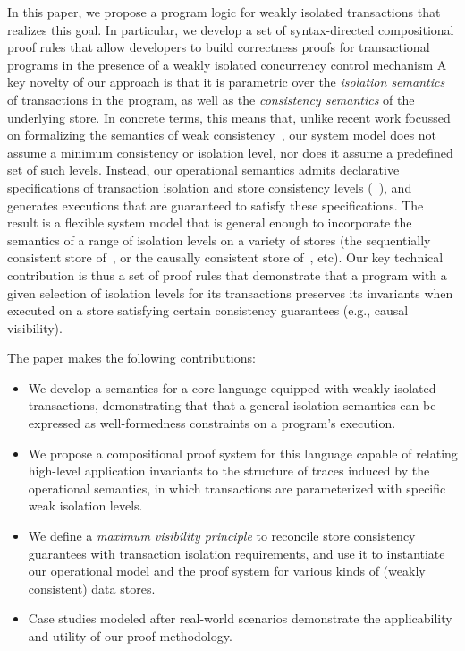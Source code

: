 
In this paper, we propose a program logic for weakly isolated
transactions that realizes this goal.  In particular, we develop a set
of syntax-directed compositional proof rules that allow developers to
build correctness proofs for transactional programs in the presence of
a weakly isolated concurrency control mechanism  A key novelty of our
approach is that it is parametric over the \emph{isolation semantics}
of transactions in the program, as well as the \emph{consistency
  semantics} of the underlying store. In concrete terms, this means
that, unlike recent work focussed on formalizing the semantics of weak
consistency~\cite{gotsmanpopl16, redblueatc, ecinec}, our system model
does not assume a minimum consistency or isolation level, nor does it
assume a predefined set of such levels.  Instead, our operational
semantics admits declarative specifications of transaction isolation
and store consistency levels (\eg~\cite{pldi15,gotsmanconcur15}), and
generates executions that are guaranteed to satisfy these
specifications. The result is a flexible system model that is general
enough to incorporate the semantics of a range of isolation levels on
a variety of stores (\eg the sequentially consistent store
of~\cite{adyaphd}, or the causally consistent store
of~\cite{gotsmanpopl16}, etc).  Our key technical contribution is thus
a set of proof rules that demonstrate that a program with a given
selection of isolation levels for its transactions preserves its
invariants when executed on a store satisfying certain consistency
guarantees (e.g., causal visibility).

The paper makes the following contributions:
\begin{itemize}
  \item We develop a semantics for a core language equipped with
    weakly isolated transactions, demonstrating that that a general
    isolation semantics can be expressed as well-formedness constraints
    on a program's execution.
  \item We propose a compositional proof system for this language
    capable of relating high-level application invariants to the structure
    of traces induced by the operational semantics, in which transactions
    are parameterized with specific weak isolation levels.
  \item We define a \emph{maximum visibility principle} to reconcile
    store consistency guarantees with transaction isolation
    requirements, and use it to instantiate our operational model and
    the proof system for various kinds of (weakly consistent) data
    stores.
  \item Case studies modeled after real-world scenarios demonstrate
    the applicability and utility of our proof methodology.
\end{itemize}

